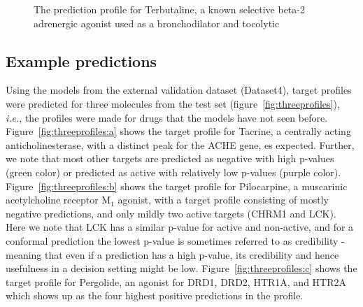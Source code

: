 \documentclass[utf8]{frontiersSCNS} %
\begin{document}
\begin{figure}
\begin{minipage}{0.25\textwidth}
        \label{fig:terbutaline:b}
    \end{minipage}
    \caption{The prediction profile for Terbutaline, a known selective beta-2
    adrenergic agonist  used as a broncho\-dilator and tocolytic
    \label{fig:web}}
\end{figure}

\subsection*{Example predictions}
Using the models from the external validation dataset (Dataset4), target
profiles were predicted for three molecules from the test set
(figure~\ref{fig:threeprofiles}), \textit{i.e.}, the profiles were made for
drugs that the models have not seen before. Figure~\ref{fig:threeprofiles:a}
shows the target profile for Tacrine, a centrally acting anticholinesterase,
with a distinct peak for the ACHE gene, es expected. Further, we note that most
other targets are predicted as negative with high p-values (green color) or
predicted as active with relatively low p-values (purple color).
Figure~\ref{fig:threeprofiles:b} shows the target profile for Pilocarpine, a
muscarinic acetylcholine receptor M$_1$ agonist, with a target profile
consisting of mostly negative predictions, and only mildly two active targets
(CHRM1 and LCK). Here we note that LCK has a similar p-value for active and
non-active, and for a conformal prediction the lowest p-value is sometimes
referred to as credibility - meaning that even if a prediction has a high
p-value, its credibility and hence usefulness in a decision setting might be
low. Figure~\ref{fig:threeprofiles:c} shows the target profile for Pergolide,
an agonist for DRD1, DRD2, HTR1A, and HTR2A which shows up as the four highest
positive predictions in the profile.
\end{document}
